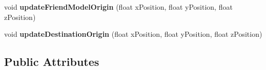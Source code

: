 \begin{DoxyCompactItemize}
\item 
\hypertarget{class_calculations_ac4a42ca72e1a272304a90d64d1328961}{void {\bfseries update\-Friend\-Model\-Origin} (float x\-Position, float y\-Position, float z\-Position)}\label{class_calculations_ac4a42ca72e1a272304a90d64d1328961}

\item 
\hypertarget{class_calculations_a87fd74af5cb6efae37c47bf1bae2fee0}{void {\bfseries update\-Destination\-Origin} (float x\-Position, float y\-Position, float z\-Position)}\label{class_calculations_a87fd74af5cb6efae37c47bf1bae2fee0}

\end{DoxyCompactItemize}
\subsection*{Public Attributes}
